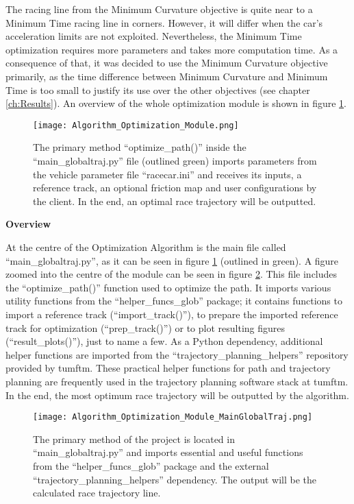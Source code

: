 The racing line from the Minimum Curvature objective is quite near to a Minimum Time racing line in corners. However, it will differ when the car's acceleration limits are not exploited. Nevertheless, the Minimum Time optimization requires more parameters and takes more computation time. As a consequence of that, it was decided to use the Minimum Curvature objective primarily, as the time difference between Minimum Curvature and Minimum Time is too small to justify its use over the other objectives (see chapter \ref{ch:Results}). An overview of the whole optimization module is shown in figure \ref{fig:Optimization Algorithm Module Overview}.
\begin{figure}[H]
    \centering
    \texttt{[image: Algorithm\_Optimization\_Module.png]}
    \caption{The primary method ``optimize\_path()'' inside the ``main\_globaltraj.py'' file (outlined green) imports parameters from the vehicle parameter file ``racecar.ini'' and receives its inputs, a reference track, an optional friction map and user configurations by the client. In the end, an optimal race trajectory will be outputted.}
    \label{fig:Optimization Algorithm Module Overview}
\end{figure}

\pagebreak

\textbf{Overview}

At the centre of the Optimization Algorithm is the main file called ``main\_globaltraj.py'', as it can be seen in figure \ref{fig:Optimization Algorithm Module Overview} (outlined in green). A figure zoomed into the centre of the module can be seen in figure \ref{fig:Optimization Algorithm Module MainGlobalTraj}. This file includes the ``optimize\_path()'' function used to optimize the path. It imports various utility functions from the ``helper\_funcs\_glob'' package; it contains functions to import a reference track (``import\_track()''), to prepare the imported reference track for optimization (``prep\_track()'') or to plot resulting figures (``result\_plots()''), just to name a few. As a Python dependency, additional helper functions are imported from the ``trajectory\_planning\_helpers'' repository provided by \acrshort{tumftm}. \cite{tumftm_trajectory_planning_helpers}
These practical helper functions for path and trajectory planning are frequently used in the trajectory planning software stack at \acrshort{tumftm}.
In the end, the most optimum race trajectory will be outputted by the algorithm.
\begin{figure}[H]
    \centering
    \texttt{[image: Algorithm\_Optimization\_Module\_MainGlobalTraj.png]}
    \caption{The primary method of the project is located in ``main\_globaltraj.py'' and imports essential and useful functions from the ``helper\_funcs\_glob'' package and the external ``trajectory\_planning\_helpers'' dependency. The output will be the calculated race trajectory line.}
    \label{fig:Optimization Algorithm Module MainGlobalTraj}
\end{figure}

